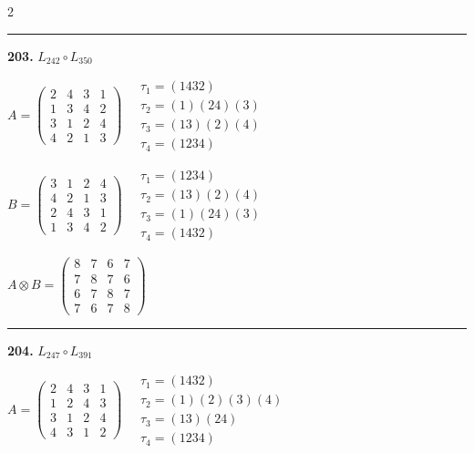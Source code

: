 \begin{multicols}{2}
\vspace{0.3em}
\hrule
\vspace{0.3em}

\noindent\textbf{203.} $L_{242} \circ L_{350}$

$A = \begin{pmatrix} 2 & 4 & 3 & 1 \\ 1 & 3 & 4 & 2 \\ 3 & 1 & 2 & 4 \\ 4 & 2 & 1 & 3 \end{pmatrix} \quad \begin{matrix} \tau_{1}=(1 4 3 2) \\ \tau_{2}=(1)(2 4)(3) \\ \tau_{3}=(1 3)(2)(4) \\ \tau_{4}=(1 2 3 4) \end{matrix}$

$B = \begin{pmatrix} 3 & 1 & 2 & 4 \\ 4 & 2 & 1 & 3 \\ 2 & 4 & 3 & 1 \\ 1 & 3 & 4 & 2 \end{pmatrix} \quad \begin{matrix} \tau_{1}=(1 2 3 4) \\ \tau_{2}=(1 3)(2)(4) \\ \tau_{3}=(1)(2 4)(3) \\ \tau_{4}=(1 4 3 2) \end{matrix}$

$A \otimes B = \begin{pmatrix} 8 & 7 & 6 & 7 \\ 7 & 8 & 7 & 6 \\ 6 & 7 & 8 & 7 \\ 7 & 6 & 7 & 8 \end{pmatrix}$

\vspace{0.3em}
\hrule
\vspace{0.3em}

\noindent\textbf{204.} $L_{247} \circ L_{391}$

$A = \begin{pmatrix} 2 & 4 & 3 & 1 \\ 1 & 2 & 4 & 3 \\ 3 & 1 & 2 & 4 \\ 4 & 3 & 1 & 2 \end{pmatrix} \quad \begin{matrix} \tau_{1}=(1 4 3 2) \\ \tau_{2}=(1)(2)(3)(4) \\ \tau_{3}=(1 3)(2 4) \\ \tau_{4}=(1 2 3 4) \end{matrix}$


\end{multicols}
